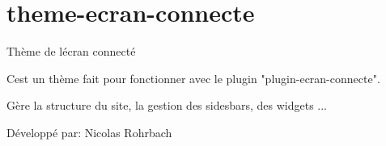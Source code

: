 \chapter{theme-\/ecran-\/connecte}
\hypertarget{md__c_1_2_users_2gallo_2_one_drive_2_documents_2_s_a_x_c3_x_a9-casali_2www_2wp-content_2themes_20785e209d8cefa1663bd4d814bfdfc0c}{}\label{md__c_1_2_users_2gallo_2_one_drive_2_documents_2_s_a_x_c3_x_a9-casali_2www_2wp-content_2themes_20785e209d8cefa1663bd4d814bfdfc0c}
\label{md__c_1_2_users_2gallo_2_one_drive_2_documents_2_s_a_x_c3_x_a9-casali_2www_2wp-content_2themes_20785e209d8cefa1663bd4d814bfdfc0c_autotoc_md777}%
%


Thème de l\textquotesingle{}écran connecté

C\textquotesingle{}est un thème  fait pour fonctionner avec le plugin "{}plugin-\/ecran-\/connecte"{}.

Gère la structure du site, la gestion des sidesbars, des widgets ...

Développé par\+: Nicolas Rohrbach 